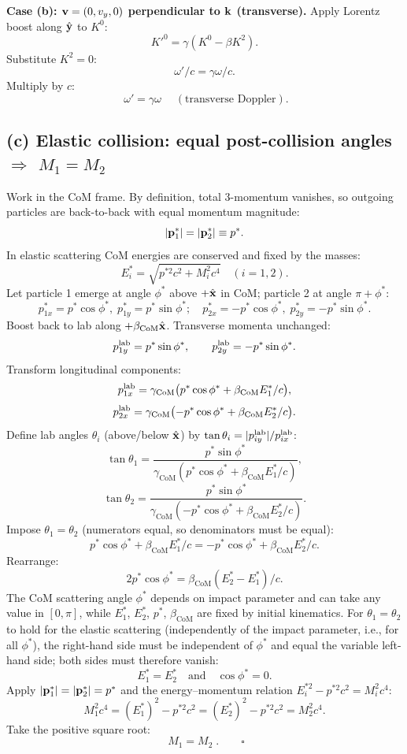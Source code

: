 \documentclass[11pt]{article}
\begin{document}
\textbf{Case (b): $\vb v=(0,v_y,0)$ perpendicular to $\vb k$ (transverse).}
Apply Lorentz boost along $\hat{\vb y}$ to $K^0$:
\[
K'^0 = \gamma(K^0 - \beta K^2).
\]
Substitute $K^2 = 0$:
\[
\omega'/c = \gamma\omega/c.
\]
Multiply by $c$:
\[
\boxed{\;\omega' = \gamma\omega\;}\quad(\text{transverse Doppler}).
\]

\subsection*{(c) Elastic collision: equal post-collision angles $\Rightarrow$ $M_1=M_2$}

Work in the CoM frame. By definition, total 3-momentum vanishes, so outgoing particles are back-to-back with equal momentum magnitude:
\[
|\vb p_1^*| = |\vb p_2^*| \equiv p^*.
\]
In elastic scattering CoM energies are conserved and fixed by the masses:
\[
E_i^* = \sqrt{p^{*2}c^2 + M_i^2 c^4}\quad(i=1,2).
\]
Let particle 1 emerge at angle $\phi^*$ above $+\hat{\vb x}$ in CoM; particle 2 at angle $\pi+\phi^*$:
\[
p^*_{1x}=p^*\cos\phi^*,\;p^*_{1y}=p^*\sin\phi^*;\quad p^*_{2x}=-p^*\cos\phi^*,\;p^*_{2y}=-p^*\sin\phi^*.
\]
Boost back to lab along $+\beta_\text{CoM}\hat{\vb x}$. Transverse momenta unchanged:
\[
p_{1y}^{\rm lab} = p^*\sin\phi^*,\qquad p_{2y}^{\rm lab} = -p^*\sin\phi^*.
\]
Transform longitudinal components:
\[
p_{1x}^{\rm lab} = \gamma_\text{CoM}\bigl(p^*\cos\phi^* + \beta_\text{CoM} E_1^*/c\bigr),
\]
\[
p_{2x}^{\rm lab} = \gamma_\text{CoM}\bigl(-p^*\cos\phi^* + \beta_\text{CoM} E_2^*/c\bigr).
\]
Define lab angles $\theta_i$ (above/below $\hat{\vb x}$) by $\tan\theta_i = |p_{iy}^{\rm lab}|/p_{ix}^{\rm lab}$:
\[
\tan\theta_1 = \frac{p^*\sin\phi^*}{\gamma_\text{CoM}(p^*\cos\phi^* + \beta_\text{CoM} E_1^*/c)},
\]
\[
\tan\theta_2 = \frac{p^*\sin\phi^*}{\gamma_\text{CoM}(-p^*\cos\phi^* + \beta_\text{CoM} E_2^*/c)}.
\]
Impose $\theta_1 = \theta_2$ (numerators equal, so denominators must be equal):
\[
p^*\cos\phi^* + \beta_\text{CoM} E_1^*/c = -p^*\cos\phi^* + \beta_\text{CoM} E_2^*/c.
\]
Rearrange:
\[
2p^*\cos\phi^* = \beta_\text{CoM}(E_2^* - E_1^*)/c.
\]
The CoM scattering angle $\phi^*$ depends on impact parameter and can take any value in $[0,\pi]$, while $E_1^*$, $E_2^*$, $p^*$, $\beta_\text{CoM}$ are fixed by initial kinematics. For $\theta_1=\theta_2$ to hold for the elastic scattering (independently of the impact parameter, i.e., for all $\phi^*$), the right-hand side must be independent of $\phi^*$ and equal the variable left-hand side; both sides must therefore vanish:
\[
E_1^* = E_2^* \quad\text{and}\quad \cos\phi^* = 0.
\]
Apply $|\vb p_1^*|=|\vb p_2^*|=p^*$ and the energy--momentum relation $E_i^{*2} - p^{*2}c^2 = M_i^2 c^4$:
\[
M_1^2 c^4 = (E_1^*)^2 - p^{*2}c^2 = (E_2^*)^2 - p^{*2}c^2 = M_2^2 c^4.
\]
Take the positive square root:
\[
\boxed{\;M_1 = M_2\;}.\qquad\square
\]
\end{document}
